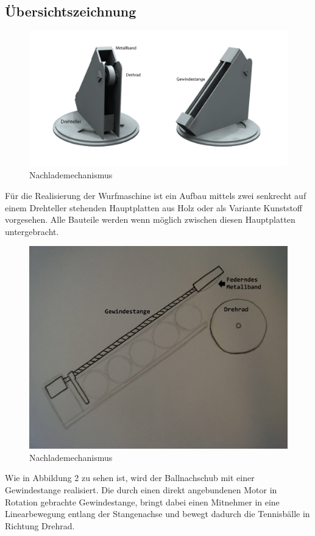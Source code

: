 \subsection{Übersichtszeichnung}

\begin{figure}[h!]
	\centering
	\includegraphics[scale=0.5]{../../fig/StudioLegende.png}
	\caption{Nachlademechanismus}
\end{figure}
Für die Realisierung der Wurfmaschine ist ein Aufbau mittels zwei senkrecht auf einem Drehteller stehenden Hauptplatten aus Holz oder als Variante Kunststoff vorgesehen. Alle Bauteile werden wenn möglich zwischen diesen Hauptplatten untergebracht.
\begin{figure}[h!]
	\centering
	\includegraphics[scale=0.35]{../../fig/Ballnachlader.jpg}
	\caption{Nachlademechanismus}
\end{figure}
Wie in Abbildung 2 zu sehen ist, wird der Ballnachschub mit einer Gewindestange realisiert. Die durch einen direkt angebundenen Motor in Rotation gebrachte Gewindestange, bringt dabei einen Mitnehmer in eine Linearbewegung entlang der Stangenachse und bewegt dadurch die Tennisbälle in Richtung Drehrad.
